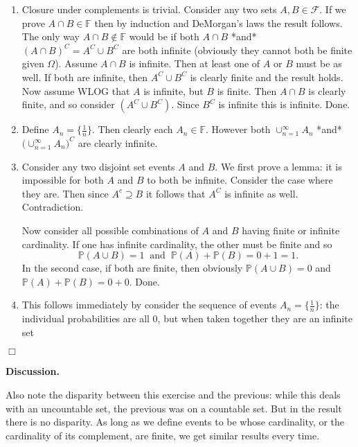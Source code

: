 \documentclass{article}
\begin{document}
\begin{enumerate}

\item Closure under complements is trivial. Consider any two sets $A, B \in \mathcal{F}$. If we prove $A \cap B \in \mathbb{F}$ then by induction and DeMorgan's laws the result follows. The only way $A \cap B \notin \mathbb{F}$ would be if both $A \cap B$ *and* $(A \cap B)^C = A^C \cup B^C$ are both infinite (obviously they cannot both be finite given $\Omega$). Assume $A \cap B$ is infinite. Then at least one of $A$ or $B$ must be as well. If both are infinite, then $A^C \cup B^C$ is clearly finite and the result holds. Now assume WLOG that $A$ is infinite, but $B$ is finite. Then $A \cap B$ is clearly finite, and so consider $(A^C \cup B^C)$. Since $B^C$ is infinite this is infinite. Done. 

\item Define $A_n = \{\frac{1}{n}\}$. Then clearly each $A_n \in \mathbb{F}$. However both $\cup_{n = 1}^{\infty} A_n$ *and* $\Big(\cup_{n = 1}^{\infty} A_n\Big)^C$ are clearly infinite. 

\item Consider any two disjoint set events $A$ and $B$. We first prove a lemma: it is impossible for both $A$ and $B$ to both be infinite. Consider the case where they are. Then since $A^c \supseteq B$ it follows that $A^C$ is infinite as well. Contradiction. 

Now consider all possible combinations of $A$ and $B$ having finite or infinite cardinality. If one has infinite cardinality, the other must be finite and so \[\mathbb{P}(A \cup B) = 1 \;\; \text{and} \;\; \mathbb{P}(A) + \mathbb{P}(B) = 0 + 1 = 1. \] In the second case, if both are finite, then obviously $\mathbb{P}(A \cup B) = 0$ and $\mathbb{P}(A) + \mathbb{P}(B) = 0 + 0$. Done.  

\item This follows immediately by consider the sequence of events $A_n = \{\frac{1}{n}\}$: the individual probabilities are all 0, but when taken together they are an infinite set

\end{enumerate}

\hfill $\Box$

\bigskip

\noindent \textbf{Discussion.} 

\medskip


Also note the disparity between this exercise and the previous: while this deals with an uncountable set, the previous was on a countable set. But in the result there is no disparity. As long as we define events to be whose cardinality, or the cardinality of its complement, are finite, we get similar results every time. 
\end{document}
